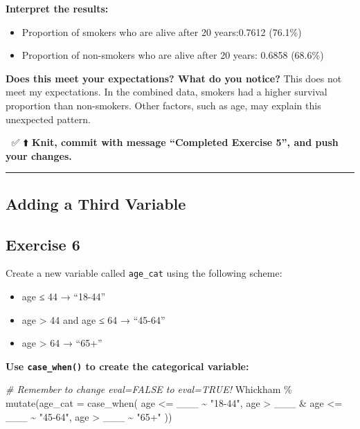 \documentclass[]{tufte-handout}
\newenvironment{Shaded}{}{}
\newcommand{\AttributeTok}[1]{\textcolor[rgb]{0.49,0.56,0.16}{#1}}
\newcommand{\CommentTok}[1]{\textcolor[rgb]{0.38,0.63,0.69}{\textit{#1}}}
\newcommand{\FunctionTok}[1]{\textcolor[rgb]{0.02,0.16,0.49}{#1}}
\newcommand{\NormalTok}[1]{#1}
\newcommand{\SpecialCharTok}[1]{\textcolor[rgb]{0.25,0.44,0.63}{#1}}
\newcommand{\StringTok}[1]{\textcolor[rgb]{0.25,0.44,0.63}{#1}}
\providecommand{\tightlist}{%
  \setlength{\itemsep}{0pt}\setlength{\parskip}{0pt}}
\begin{document}
\textbf{Interpret the results:}

\begin{itemize}
\tightlist
\item
  Proportion of smokers who are alive after 20 years:0.7612 (76.1\%)
\item
  Proportion of non-smokers who are alive after 20 years: 0.6858
  (68.6\%)
\end{itemize}

\textbf{Does this meet your expectations? What do you notice?} This does
not meet my expectations. In the combined data, smokers had a higher
survival proportion than non-smokers. Other factors, such as age, may
explain this unexpected pattern.

🧶 ✅ ⬆️ \textbf{Knit, commit with message ``Completed Exercise 5'', and
push your changes.}

\begin{center}\rule{0.5\linewidth}{0.5pt}\end{center}

\subsection{Adding a Third Variable}\label{adding-a-third-variable}

\subsection{Exercise 6}\label{exercise-6}

Create a new variable called \texttt{age\_cat} using the following
scheme:

\begin{itemize}
\tightlist
\item
  age ≤ 44 → ``18-44''
\item
  age \textgreater{} 44 and age ≤ 64 → ``45-64''
\item
  age \textgreater{} 64 → ``65+''
\end{itemize}

\textbf{Use \texttt{case\_when()} to create the categorical variable:}

\begin{Shaded}
\begin{Highlighting}[]
\CommentTok{\# Remember to change eval=FALSE to eval=TRUE!}
\NormalTok{Whickham \%}
  \FunctionTok{mutate}\NormalTok{(}\AttributeTok{age\_cat =} \FunctionTok{case\_when}\NormalTok{(}
\NormalTok{    age }\SpecialCharTok{\textless{}=}\NormalTok{ \_\_\_ }\SpecialCharTok{\textasciitilde{}} \StringTok{"18{-}44"}\NormalTok{,}
\NormalTok{    age }\SpecialCharTok{\textgreater{}}\NormalTok{ \_\_\_ }\SpecialCharTok{\&}\NormalTok{ age }\SpecialCharTok{\textless{}=}\NormalTok{ \_\_\_ }\SpecialCharTok{\textasciitilde{}} \StringTok{"45{-}64"}\NormalTok{,}
\NormalTok{    age }\SpecialCharTok{\textgreater{}}\NormalTok{ \_\_\_ }\SpecialCharTok{\textasciitilde{}} \StringTok{"65+"}
\NormalTok{  ))}
\end{Highlighting}
\end{Shaded}
\end{document}
